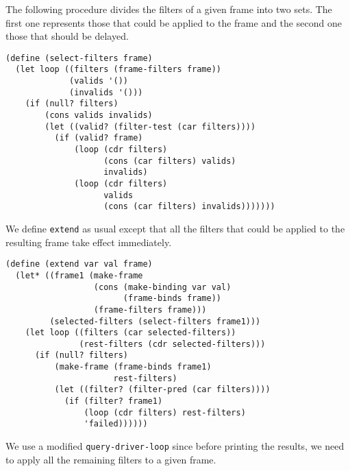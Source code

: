 \documentclass[a4paper,12pt]{article}
\begin{document}
The following procedure divides the filters of a given frame into two
sets.  The first one represents those that could be applied to the
frame and the second one those that should be delayed.
\begin{lstlisting}
(define (select-filters frame)
  (let loop ((filters (frame-filters frame))
             (valids '())
             (invalids '()))
    (if (null? filters)
        (cons valids invalids)
        (let ((valid? (filter-test (car filters))))
          (if (valid? frame)
              (loop (cdr filters)
                    (cons (car filters) valids)
                    invalids)
              (loop (cdr filters)
                    valids
                    (cons (car filters) invalids)))))))
\end{lstlisting}

We define \lstinline!extend! as usual except that all the filters that
could be applied to the resulting frame take effect immediately.

\begin{lstlisting}
(define (extend var val frame)
  (let* ((frame1 (make-frame
                  (cons (make-binding var val)
                        (frame-binds frame))
                  (frame-filters frame)))
         (selected-filters (select-filters frame1)))
    (let loop ((filters (car selected-filters))
               (rest-filters (cdr selected-filters)))
      (if (null? filters)
          (make-frame (frame-binds frame1)
                      rest-filters)
          (let ((filter? (filter-pred (car filters))))
            (if (filter? frame1)
                (loop (cdr filters) rest-filters)
                'failed))))))
\end{lstlisting}

We use a modified \lstinline!query-driver-loop! since before printing
the results, we need to apply all the remaining filters to a given
frame.
\end{document}
